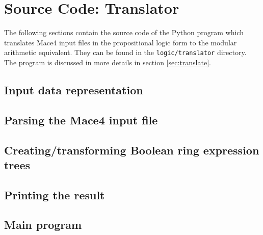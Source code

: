 \chapter{Source Code: Translator} 
\label{sec:code_translator}


The following sections contain the source code of the Python program which translates Mace4 input files in the propositional logic form to the modular arithmetic equivalent. They can be found in the \verb|logic/translator| directory. The program is discussed in more details in section \ref{sec:translate}. 


\section{Input data representation}



\section{Parsing the Mace4 input file}



\section{Creating/transforming Boolean ring expression trees}



\section{Printing the result}



\section{Main program}

